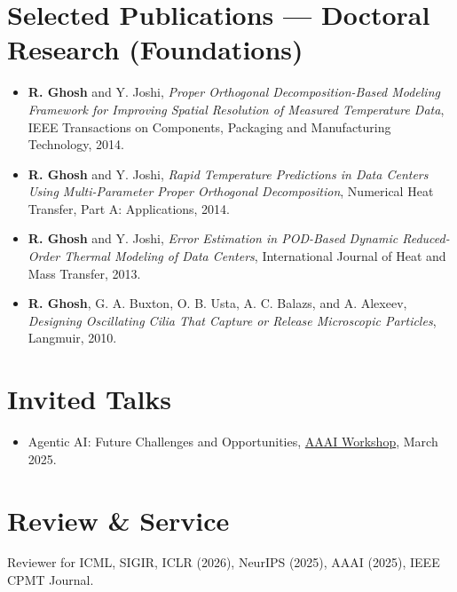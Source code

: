 \documentclass[10.5pt]{article}
\begin{document}
\section{Selected Publications --- Doctoral Research (Foundations)}
\begin{itemize}
  \item \textbf{R. Ghosh} and Y. Joshi, \textit{Proper Orthogonal Decomposition-Based Modeling Framework for Improving Spatial Resolution of Measured Temperature Data}, IEEE Transactions on Components, Packaging and Manufacturing Technology, 2014.
  \item \textbf{R. Ghosh} and Y. Joshi, \textit{Rapid Temperature Predictions in Data Centers Using Multi-Parameter Proper Orthogonal Decomposition}, Numerical Heat Transfer, Part A: Applications, 2014.
  \item \textbf{R. Ghosh} and Y. Joshi, \textit{Error Estimation in POD-Based Dynamic Reduced-Order Thermal Modeling of Data Centers}, International Journal of Heat and Mass Transfer, 2013.
  \item \textbf{R. Ghosh}, G. A. Buxton, O. B. Usta, A. C. Balazs, and A. Alexeev, \textit{Designing Oscillating Cilia That Capture or Release Microscopic Particles}, Langmuir, 2010.
\end{itemize}

\section{Invited Talks}
\begin{itemize}
  \item Agentic AI: Future Challenges and Opportunities, \href{https://sites.google.com/view/datasafe25/home}{AAAI Workshop}, March 2025.
\end{itemize}

\section{Review \& Service}
Reviewer for ICML, SIGIR, ICLR (2026), NeurIPS (2025), AAAI (2025), IEEE CPMT Journal.
\end{document}
